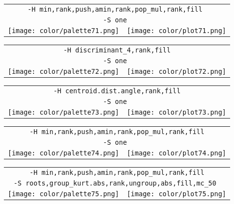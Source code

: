 \documentclass{article}
\begin{document}
\begin{center}
\begin{tabular}{m{8cm}m{8cm}}
\multicolumn{2}{c}{\tt -H min,rank,push,amin,rank,pop\_mul,rank,fill } \\
\multicolumn{2}{c}{\tt -S one } \\
\texttt{[image: color/palette71.png]} &
\texttt{[image: color/plot71.png]}
\end{tabular}
\end{center}

\begin{center}
\begin{tabular}{m{8cm}m{8cm}}
\multicolumn{2}{c}{\tt -H discriminant\_4,rank,fill} \\
\multicolumn{2}{c}{\tt -S one } \\
\texttt{[image: color/palette72.png]} &
\texttt{[image: color/plot72.png]}
\end{tabular}
\end{center}

\begin{center}
\begin{tabular}{m{8cm}m{8cm}}
\multicolumn{2}{c}{\tt -H centroid.dist.angle,rank,fill} \\
\multicolumn{2}{c}{\tt -S one } \\
\texttt{[image: color/palette73.png]} &
\texttt{[image: color/plot73.png]}
\end{tabular}
\end{center}

\begin{center}
\begin{tabular}{m{8cm}m{8cm}}
\multicolumn{2}{c}{\tt -H min,rank,push,amin,rank,pop\_mul,rank,fill} \\
\multicolumn{2}{c}{\tt -S one } \\
\texttt{[image: color/palette74.png]} &
\texttt{[image: color/plot74.png]}
\end{tabular}
\end{center}

\begin{center}
\begin{tabular}{m{8cm}m{8cm}}
\multicolumn{2}{c}{\tt -H min,rank,push,amin,rank,pop\_mul,rank,fill} \\
\multicolumn{2}{c}{\tt -S roots,group\_kurt.abs,rank,ungroup,abs,fill,mc\_50 } \\
\texttt{[image: color/palette75.png]} &
\texttt{[image: color/plot75.png]}
\end{tabular}
\end{center}
\end{document}
